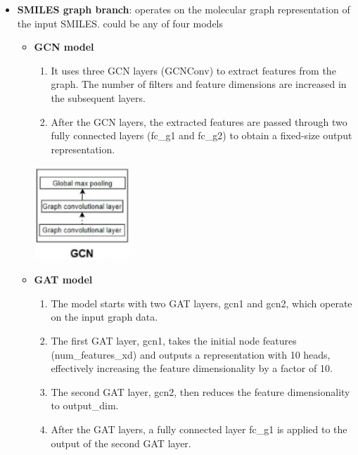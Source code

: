 \documentclass[11pt, a4paper]{article}
\begin{document}
    \begin{itemize}
        \item \textbf{SMILES graph branch}: operates on the molecular graph representation of the input SMILES. could be any of four models
        \begin{itemize}
            \item \textbf{GCN model} 
                \begin{enumerate}
                    \item It uses three GCN layers (GCNConv) to extract features from the graph. The number of filters and feature dimensions are increased in the subsequent layers.
                    \item After the GCN layers, the extracted features are passed through two fully connected layers (fc\_g1 and fc\_g2) to obtain a fixed-size output representation.
                \end{enumerate}

                \begin{center}
                    \includegraphics[width=0.3\textwidth]{GCN_model.PNG}
                \end{center}

            \item \textbf{GAT model}
                \begin{enumerate}
                    \item The model starts with two GAT layers, gcn1 and gcn2, which operate on the input graph data.
                    \item The first GAT layer, gcn1, takes the initial node features (num\_features\_xd) and outputs a representation with 10 heads, effectively increasing the feature dimensionality by a factor of 10.
                    \item The second GAT layer, gcn2, then reduces the feature dimensionality to output\_dim.
                    \item After the GAT layers, a fully connected layer fc\_g1 is applied to the output of the second GAT layer.
                \end{enumerate}


\end{itemize}
\end{itemize}
\end{document}
